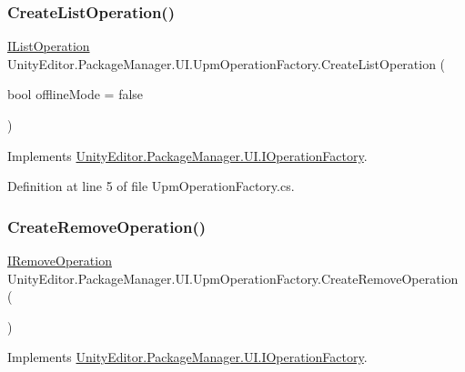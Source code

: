 \subsubsection{\texorpdfstring{CreateListOperation()}{CreateListOperation()}}
{\footnotesize\ttfamily \mbox{\hyperlink{interface_unity_editor_1_1_package_manager_1_1_u_i_1_1_i_list_operation}{I\+List\+Operation}} Unity\+Editor.\+Package\+Manager.\+U\+I.\+Upm\+Operation\+Factory.\+Create\+List\+Operation (\begin{DoxyParamCaption}\item[{bool}]{offline\+Mode = {\ttfamily false} }\end{DoxyParamCaption})}



Implements \mbox{\hyperlink{interface_unity_editor_1_1_package_manager_1_1_u_i_1_1_i_operation_factory_a4a8dc6a8401962d62f9fe1e4eb83cde6}{Unity\+Editor.\+Package\+Manager.\+U\+I.\+I\+Operation\+Factory}}.



Definition at line 5 of file Upm\+Operation\+Factory.\+cs.

\mbox{\label{class_unity_editor_1_1_package_manager_1_1_u_i_1_1_upm_operation_factory_ab996d83fd2c343c982c264fdf046ab90}} 
\subsubsection{\texorpdfstring{CreateRemoveOperation()}{CreateRemoveOperation()}}
{\footnotesize\ttfamily \mbox{\hyperlink{interface_unity_editor_1_1_package_manager_1_1_u_i_1_1_i_remove_operation}{I\+Remove\+Operation}} Unity\+Editor.\+Package\+Manager.\+U\+I.\+Upm\+Operation\+Factory.\+Create\+Remove\+Operation (\begin{DoxyParamCaption}{ }\end{DoxyParamCaption})}



Implements \mbox{\hyperlink{interface_unity_editor_1_1_package_manager_1_1_u_i_1_1_i_operation_factory_aa8a45874d7de57734cf4d7591b07c561}{Unity\+Editor.\+Package\+Manager.\+U\+I.\+I\+Operation\+Factory}}.



